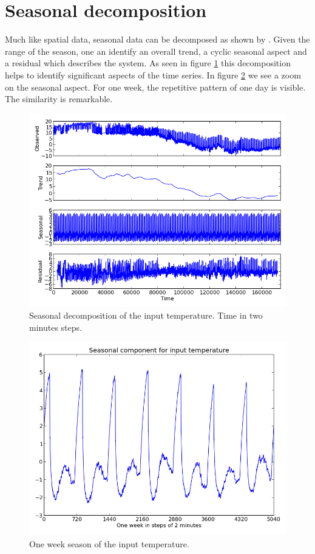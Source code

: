 \documentclass{scrartcl}
\begin{document}
\section{Seasonal decomposition}
\label{sec:season}
Much like spatial data, seasonal data can be decomposed as shown by \cite{loess}. Given the range of the season, one an identify an overall trend, a cyclic seasonal aspect and a residual which describes the system. As seen in figure \ref{fig:decomp} this decomposition helps to identify significant aspects of the time series. In figure \ref{fig:season} we see a zoom on the seasonal aspect. For one week, the repetitive pattern of one day is visible. The similarity is remarkable.


\begin{figure}[H]
  \centering
  \includegraphics[width=0.5\linewidth]{img/seasondecomposition-input-temperature.png}
  \caption{Seasonal decomposition of the input temperature. Time in two minutes steps.}
  \label{fig:decomp}
\end{figure}

\begin{figure}[H]
  \centering
  \includegraphics[width=0.5\linewidth]{img/season-input-temperature.png}
  \caption{One week season of the input temperature.}
  \label{fig:season}
\end{figure}
\end{document}

